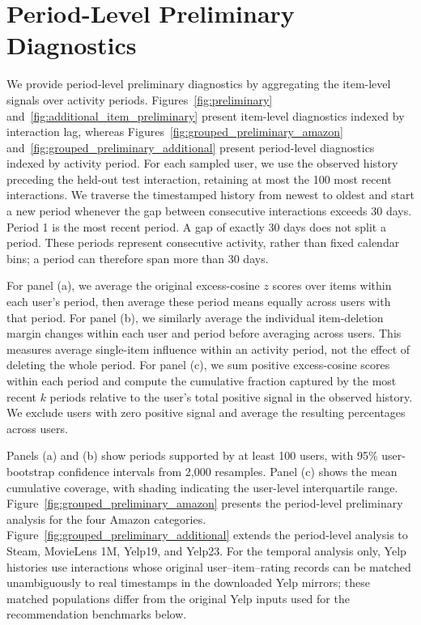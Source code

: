 ﻿\documentclass[sigconf,anonymous,review]{acmart}
\begin{document}
\section{Period-Level Preliminary Diagnostics}
\label{app:grouped_preliminary}
We provide period-level preliminary diagnostics by aggregating the item-level signals over activity periods. Figures~\ref{fig:preliminary} and~\ref{fig:additional_item_preliminary} present item-level diagnostics indexed by interaction lag, whereas Figures~\ref{fig:grouped_preliminary_amazon} and~\ref{fig:grouped_preliminary_additional} present period-level diagnostics indexed by activity period. For each sampled user, we use the observed history preceding the held-out test interaction, retaining at most the 100 most recent interactions. We traverse the timestamped history from newest to oldest and start a new period whenever the gap between consecutive interactions exceeds 30 days. Period 1 is the most recent period. A gap of exactly 30 days does not split a period. These periods represent consecutive activity, rather than fixed calendar bins; a period can therefore span more than 30 days.

For panel (a), we average the original excess-cosine $z$ scores over items within each user's period, then average these period means equally across users with that period. For panel (b), we similarly average the individual item-deletion margin changes within each user and period before averaging across users. This measures average single-item influence within an activity period, not the effect of deleting the whole period. For panel (c), we sum positive excess-cosine scores within each period and compute the cumulative fraction captured by the most recent $k$ periods relative to the user's total positive signal in the observed history. We exclude users with zero positive signal and average the resulting percentages across users.

Panels (a) and (b) show periods supported by at least 100 users, with 95\% user-bootstrap confidence intervals from 2,000 resamples. Panel (c) shows the mean cumulative coverage, with shading indicating the user-level interquartile range. Figure~\ref{fig:grouped_preliminary_amazon} presents the period-level preliminary analysis for the four Amazon categories. Figure~\ref{fig:grouped_preliminary_additional} extends the period-level analysis to Steam, MovieLens 1M, Yelp19, and Yelp23. For the temporal analysis only, Yelp histories use interactions whose original user--item--rating records can be matched unambiguously to real timestamps in the downloaded Yelp mirrors; these matched populations differ from the original Yelp inputs used for the recommendation benchmarks below.
\end{document}
